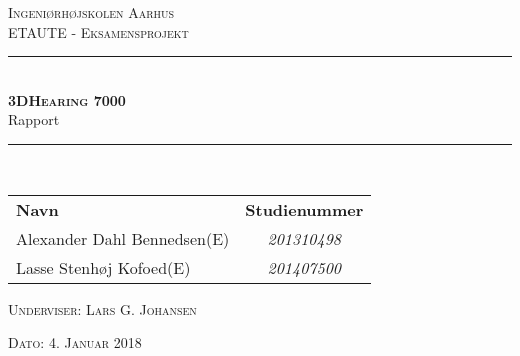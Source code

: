 \newcommand{\HRule}{\rule{\linewidth}{0.1mm}} %

\thispagestyle{empty}
\begin{center}
	\textsc{\LARGE Ingeniørhøjskolen Aarhus}\\[1.5cm] %

	
	\textsc{\large ETAUTE - Eksamensprojekt}\\[2.5cm] 
	\HRule \\[0.8cm]
	{\huge \bfseries \textsc{3DHearing 7000}} \\[0.5cm]{\LARGE Rapport} \\[0.4cm]
	\HRule \\[1.5cm]
	
	\vspace{0.5 in}
	\begin{center}
		\begin{tabular}{l c}
			\textbf{Navn} & \textbf{Studienummer} \\
			Alexander Dahl Bennedsen(E) & \textsl{201310498}    \\
			Lasse Stenhøj Kofoed(E) & \textsl{201407500}  \\
			
			
		\end{tabular}
	\end{center}
	\vspace{0.5 in}
	
	\textsc{\large Underviser: Lars G. Johansen}
	\vspace{0.5 in}
	
	\textsc{\large Dato: 4. Januar 2018}\\
	
\end{center} %

\newpage
